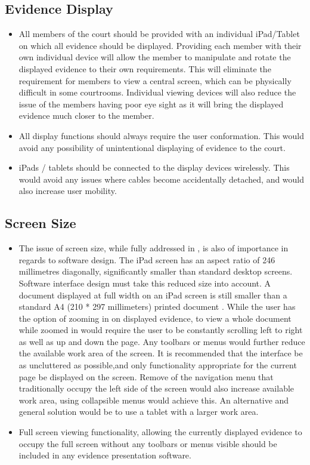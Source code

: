 \subsection{Evidence Display}
\begin{itemize}
    \item All members of the court should be provided with an individual iPad/Tablet on which all evidence should be displayed. Providing each member with their own individual device will allow the member to manipulate and rotate the displayed evidence to their own requirements. This will eliminate the requirement for members to view a central screen, which can be physically difficult in some courtrooms. Individual viewing devices will also reduce the issue of the members having poor eye sight as it will bring the displayed evidence much closer to the member.
    \item All display functions should always require the user conformation. This would avoid any possibility of unintentional displaying of evidence to the court.
    \item iPads / tablets should be connected to the display devices wirelessly. This would avoid any issues where cables become accidentally detached, and would also increase user mobility.
\end{itemize}

\subsection{Screen Size}
\begin{itemize}
    \item The issue of screen size, while fully addressed in , is also of importance in regards to software design. The iPad screen has an aspect ratio of 246 millimetres diagonally, significantly smaller than standard desktop screens. Software interface design must take this reduced size into account. A document displayed at full width on an iPad screen is still smaller than a standard A4 (210 * 297 millimeters) printed document . While the user has the option of zooming in on displayed evidence, to view a whole document while zoomed in would require the user to be constantly scrolling left to right as well as up and down the page. Any toolbars or menus would further reduce the available work area of the screen. It is recommended that the interface be as uncluttered as possible,and  only functionality appropriate for the current page be displayed on the screen. Remove of the navigation menu that traditionally occupy the left side of the screen would also increase available work area, using collapsible menus would achieve this. An alternative and general solution would be to use a tablet with a larger work area.
    \item Full screen viewing functionality, allowing the currently displayed evidence to occupy the full screen without any toolbars or menus visible should be included in any evidence presentation software.
    
\end{itemize}

